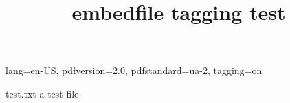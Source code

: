 \DocumentMetadata
  {
    lang=en-US,
    pdfversion=2.0,
    pdfstandard=ua-2,
    tagging=on
  }
\begin{filecontents}{test.txt}
a test file
\end{filecontents}
\documentclass{article}
\usepackage{embedfile}

\title{embedfile tagging test}


text
